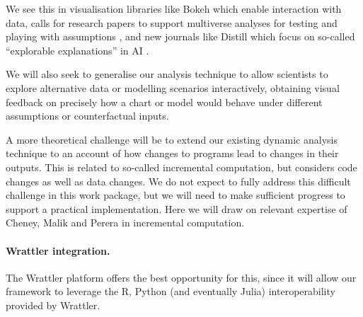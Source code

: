 We see this in visualisation libraries like Bokeh \cite{jolly18} which enable
interaction with data, calls for research papers to support multiverse analyses
for testing and playing with assumptions \cite{dragicevic19}, and new journals
like Distill which focus on so-called ``explorable explanations'' in AI
\cite{goertler19}.

\secbreak

We will also seek to generalise our analysis technique to allow scientists to
explore alternative data or modelling scenarios interactively, obtaining visual
feedback on precisely how a chart or model would behave under different
assumptions or counterfactual inputs.

A more theoretical challenge will be to extend our existing dynamic analysis
technique to an account of how changes to programs lead to changes in their
outputs. This is related to so-called incremental computation, but considers
code changes as well as data changes. We do not expect to fully address this
difficult challenge in this work package, but we will need to make sufficient
progress to support a practical implementation. Here we will draw on relevant
expertise of Cheney, Malik and Perera in incremental computation.

\secbreak

\paragraph{Wrattler integration.} The Wrattler platform offers the best
opportunity for this, since it will allow our framework to leverage the R,
Python (and eventually Julia) interoperability provided by Wrattler.
